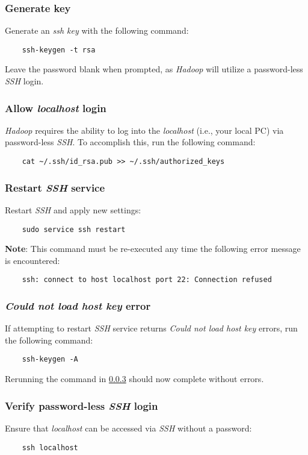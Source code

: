 \documentclass{article}
\begin{document}
    \subsubsection{Generate key}
    Generate an \emph{ssh key} with the following command:
    \begin{verbatim}
    ssh-keygen -t rsa
    \end{verbatim}
    Leave the password blank when prompted, as \emph{Hadoop} will utilize a password-less
    \emph{SSH} login.

    \subsubsection{Allow \emph{localhost} login}
    \emph{Hadoop} requires the ability to log into the \emph{localhost} (i.e., your local PC) via
    password-less \emph{SSH}. To accomplish this, run the following command:
    \begin{verbatim}
    cat ~/.ssh/id_rsa.pub >> ~/.ssh/authorized_keys
    \end{verbatim}

    \subsubsection{Restart \emph{SSH} service}
    \label{subsec:sshrestart}
    Restart \emph{SSH} and apply new settings:
    \begin{verbatim}
    sudo service ssh restart
    \end{verbatim}
    \textbf{Note}: This command must be re-executed any time the following error message is
    encountered:
    \begin{verbatim}
    ssh: connect to host localhost port 22: Connection refused
    \end{verbatim}

    \subsubsection{\emph{Could not load host key} error}
    If attempting to restart \emph{SSH} service returns \emph{Could not load host key} errors, run
    the following command:
    \begin{verbatim}
    ssh-keygen -A
    \end{verbatim}
    Rerunning the command in \ref{subsec:sshrestart} should now complete without errors.

    \subsubsection{Verify password-less \emph{SSH} login}
    Ensure that \emph{localhost} can be accessed via \emph{SSH} without a password:
    \begin{verbatim}
    ssh localhost
    \end{verbatim}
\end{document}

